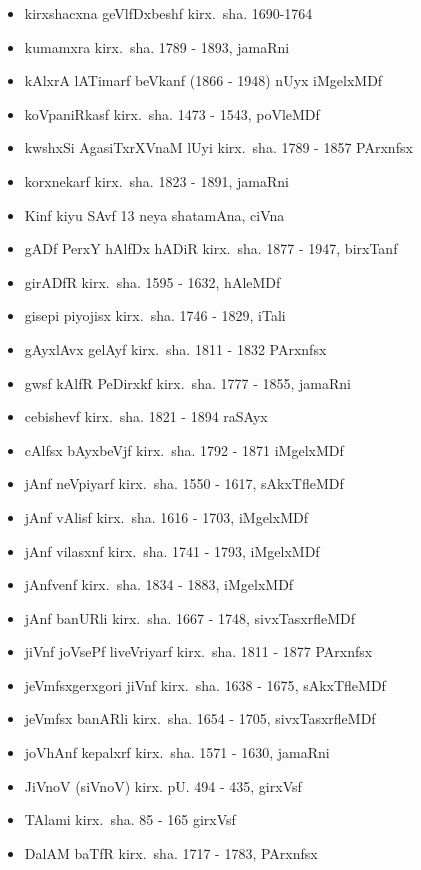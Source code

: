 {\begin{itemize}
\item kirxshacxna geVlfDxbeshf kirx.~sha. {\rm 1690-1764}
\item kumamxra kirx.~sha. {\rm 1789 - 1893}, jamaRni
\item kAlxrA lATimarf beVkanf {\rm (1866 - 1948)} nUyx iMgelxMDf
\item koVpaniRkasf kirx.~sha. {\rm 1473 - 1543}, poVleMDf
\item kwshxSi AgasiTxrXVnaM lUyi kirx.~sha. {\rm 1789 - 1857} PArxnfsx
\item korxnekarf kirx.~sha. {\rm 1823 - 1891}, jamaRni
\item Kinf kiyu SAvf {\rm 13} neya shatamAna, ciVna
\item gADf PerxY hAlfDx hADiR kirx.~sha. {\rm 1877 - 1947}, birxTanf
\item girADfR kirx.~sha. {\rm 1595 - 1632}, hAleMDf
\item gisepi piyojisx kirx.~sha. {\rm 1746 - 1829}, iTali
\item gAyxlAvx gelAyf kirx.~sha. {\rm 1811 - 1832} PArxnfsx
\item gwsf kAlfR PeDirxkf kirx.~sha. {\rm 1777 - 1855}, jamaRni
\item cebishevf kirx.~sha. {\rm 1821 - 1894} raSAyx
\item cAlfsx bAyxbeVjf kirx.~sha. {\rm 1792 - 1871} iMgelxMDf
\item jAnf neVpiyarf kirx.~sha. {\rm 1550 - 1617}, sAkxTfleMDf
\item jAnf vAlisf kirx.~sha. {\rm 1616 - 1703}, iMgelxMDf
\item jAnf vilasxnf kirx.~sha. {\rm 1741 - 1793}, iMgelxMDf
\item jAnfvenf kirx.~sha. {\rm 1834 - 1883}, iMgelxMDf
\item jAnf banURli kirx.~sha. {\rm 1667 - 1748}, sivxTasxrfleMDf
\item jiVnf joVsePf liveVriyarf kirx.~sha. {\rm 1811 - 1877} PArxnfsx
\item jeVmfsxgerxgori jiVnf kirx.~sha. {\rm 1638 - 1675}, sAkxTfleMDf
\item jeVmfsx banARli kirx.~sha. {\rm 1654 - 1705}, sivxTasxrfleMDf
\item joVhAnf kepalxrf kirx.~sha. {\rm 1571 - 1630}, jamaRni
\item JiVnoV (siVnoV) kirx. pU. {\rm 494 - 435}, girxVsf
\item TAlami kirx.~sha. {\rm 85 - 165} girxVsf
\item DalAM baTfR kirx.~sha. {\rm 1717 - 1783}, PArxnfsx

\end{itemize}}
